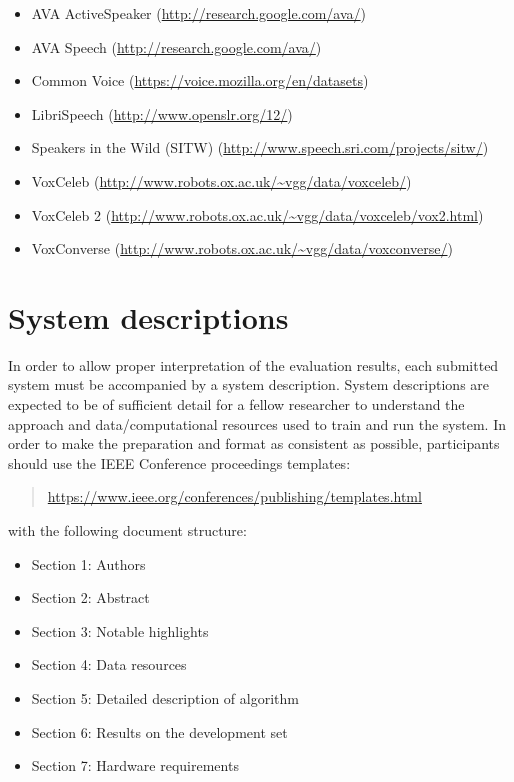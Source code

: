 \documentclass{article}
\begin{document}
\begin{appendices}
\vspace{0.25cm}
\begin{itemize}
    \item AVA ActiveSpeaker (\url{http://research.google.com/ava/})
    \item AVA Speech (\url{http://research.google.com/ava/})
    \item Common Voice (\url{https://voice.mozilla.org/en/datasets})
    \item LibriSpeech (\url{http://www.openslr.org/12/})
    \item Speakers in the Wild (SITW) (\url{http://www.speech.sri.com/projects/sitw/})
    \item VoxCeleb (\url{http://www.robots.ox.ac.uk/~vgg/data/voxceleb/})
    \item VoxCeleb 2 (\url{http://www.robots.ox.ac.uk/~vgg/data/voxceleb/vox2.html})
    \item VoxConverse (\url{http://www.robots.ox.ac.uk/~vgg/data/voxconverse/})
\end{itemize}




\newpage
\section{System descriptions}
\label{app:system}
In order to allow proper interpretation of the evaluation results, each submitted system must be accompanied by a system description. System descriptions are expected to be of sufficient detail for a fellow researcher to understand the approach and data/computational resources used to train and run the system. In order to make the preparation and format as consistent as possible, participants should use the IEEE Conference proceedings templates:
    \begin{quote}
        \url{https://www.ieee.org/conferences/publishing/templates.html}
    \end{quote}
    
with the following document structure:

%
\begin{itemize}
    \item Section 1: Authors
    \item Section 2: Abstract
    \item Section 3: Notable highlights
    \item Section 4: Data resources
    \item Section 5: Detailed description of algorithm
    \item Section 6: Results on the development set
    \item Section 7: Hardware requirements
\end{itemize}



\end{appendices}
\end{document}
